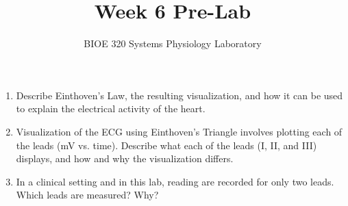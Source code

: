 \documentclass{article}
\title{Week 6 Pre-Lab}
\author{BIOE 320 Systems Physiology Laboratory}
\date{}
\begin{document}
\maketitle
\large

\begin{enumerate}
	\item Describe Einthoven's Law, the resulting visualization, and how it can be used to explain the electrical activity of the heart.
	\item Visualization of the ECG using Einthoven's Triangle involves plotting each of the leads (mV vs. time). Describe what each of the leads (I, II, and III) displays, and how and why the visualization differs.
	\item In a clinical setting and in this lab, reading are recorded for only two leads. Which leads are measured? Why?
\end{enumerate}
\end{document}
